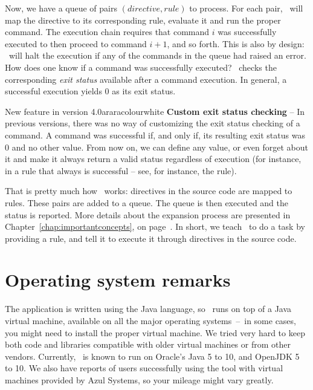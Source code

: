 Now, we have a queue of pairs $(\textit{directive}, \textit{rule})$ to process. For each pair, \arara\ will map the directive to its corresponding rule, evaluate it and run the proper command. The execution chain requires that command $i$ was successfully executed to then proceed to command $i+1$, and so forth. This is also by design: \arara\ will halt the execution if any of the commands in the queue had raised an error. How does one know if a command was successfully executed? \arara\ checks the corresponding \emph{exit status} available after a command execution. In general, a successful execution yields 0 as its exit status.

\begin{messagebox}{New feature in version 4.0}{araracolour}{\icinfo}{white}
\textbf{Custom exit status checking} -- In previous versions, there was no way of customizing the exit status checking of a command. A command was successful if, and only if, its resulting exit status was 0 and no other value. From now on, we can define any value, or even forget about it and make it always return a valid status regardless of execution (for instance, in a rule that always is successful -- see, for instance, the   rule).
\end{messagebox}

That is pretty much how \arara\ works: directives in the source code are mapped to rules. These pairs are added to a queue. The queue is then executed and the status is reported. More details about the expansion process are presented in Chapter~\ref{chap:importantconcepts}, on page~\pageref{chap:importantconcepts}. In short, we teach \arara\ to do a task by providing a rule, and tell it to execute it through directives in the source code.

\section{Operating system remarks}
\label{sec:operatingsystemremarks}

The application is written using the Java language, so \arara\ runs on top of a Java virtual machine, available on all the major operating systems~--~in some cases, you might need to install the proper virtual machine. We tried very hard to keep both code and libraries compatible with older virtual machines or from other vendors. Currently, \arara\ is known to run on Oracle's Java 5 to 10, and OpenJDK 5 to 10. We also have reports of users successfully using the tool with virtual machines provided by Azul Systems, so your mileage might vary greatly.

